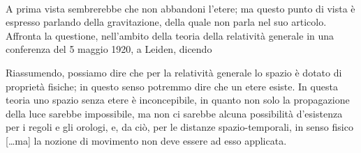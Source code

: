 \paragraph{} A prima vista sembrerebbe che \poin{} non abbandoni
  l'etere; ma questo punto di vista \`e espresso parlando della
  gravitazione, della quale \ein{} non parla nel suo articolo. Affronta
  la questione, nell'ambito della teoria della relativit\`a generale in
  una conferenza del 5 maggio 1920, a Leiden, dicendo
\begin{citaz}
 Riassumendo, possiamo dire che per la relativit\`a generale lo spazio
 \`e dotato di propriet\`a fisiche; in questo senso potremmo dire che un
 etere esiste. In questa teoria uno spazio senza etere \`e
 inconcepibile, in quanto non solo la propagazione della luce sarebbe
 impossibile, ma non ci sarebbe alcuna possibilit\`a d'esistenza per i
 regoli e gli orologi, e, da ci\`o, per le distanze spazio-temporali, in
 senso fisico [\ldots ma] la nozione di movimento non deve essere ad
 esso applicata.
\end{citaz}


